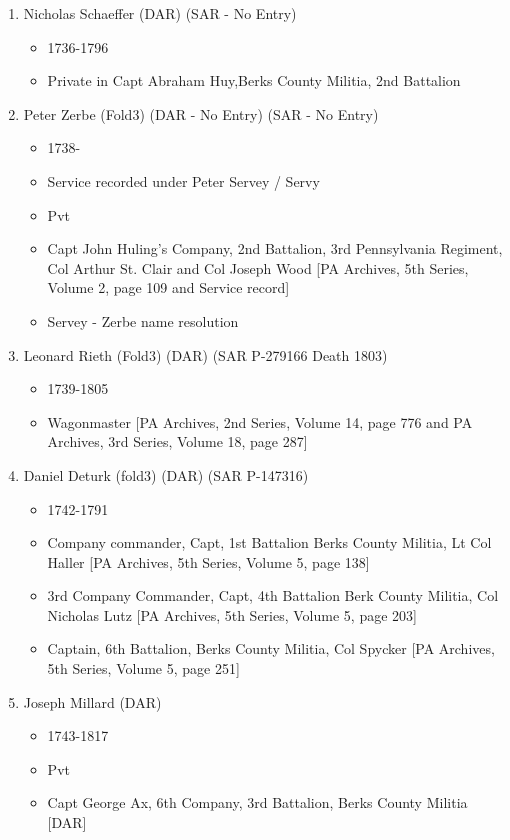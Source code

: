 \documentclass[11pt,letter]{book}
\begin{document}
\begin{enumerate}
\item Nicholas Schaeffer (DAR) (SAR - No Entry)
\begin{itemize}
\item 1736-1796
\item Private in Capt Abraham Huy,Berks County Militia, 2nd Battalion
\end{itemize}
\item Peter Zerbe (Fold3) (DAR - No Entry) (SAR - No Entry)
\begin{itemize}
\item 1738-
\item Service recorded under Peter Servey / Servy
\item Pvt
\item Capt John Huling's Company, 2nd Battalion, 3rd Pennsylvania Regiment, Col Arthur St. Clair and Col Joseph Wood [PA Archives, 5th Series, Volume 2, page 109 and Service record]
\item Servey - Zerbe name resolution
\end{itemize}
\item Leonard Rieth (Fold3) (DAR) (SAR P-279166 Death 1803)
\begin{itemize}
\item 1739-1805
\item Wagonmaster [PA Archives, 2nd Series, Volume 14, page 776 and PA Archives, 3rd Series, Volume 18, page 287]
\end{itemize}
\item Daniel Deturk (fold3) (DAR) (SAR P-147316)
\begin{itemize}
\item 1742-1791
\item Company commander, Capt, 1st Battalion Berks County Militia, Lt Col Haller [PA Archives, 5th Series, Volume 5, page 138]
\item 3rd Company Commander, Capt, 4th Battalion Berk County Militia, Col Nicholas Lutz [PA Archives, 5th Series, Volume 5, page 203]
\item Captain, 6th Battalion, Berks County Militia, Col Spycker [PA Archives, 5th Series, Volume 5, page 251]
\end{itemize}
\item Joseph Millard (DAR)
\begin{itemize}
\item 1743-1817
\item Pvt
\item Capt George Ax, 6th Company, 3rd Battalion, Berks County Militia [DAR]
\end{itemize}

\end{enumerate}
\end{document}
